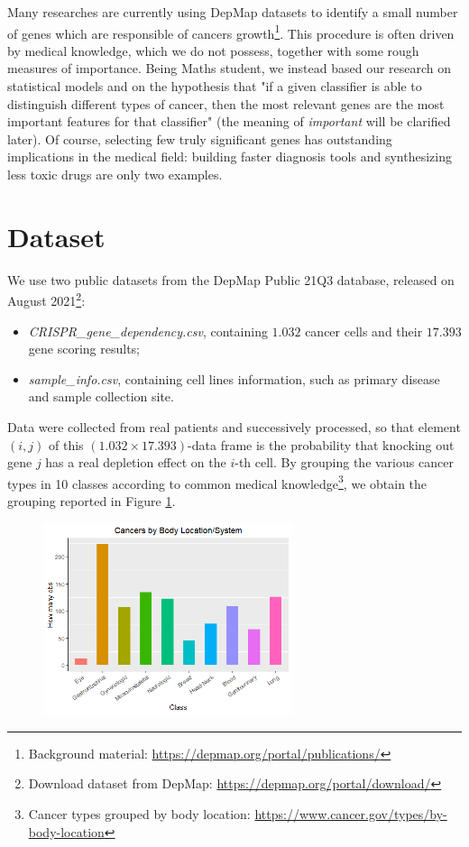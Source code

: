 \documentclass[a4paper,11pt, oneside]{article}  %
\begin{document}
Many researches are currently using DepMap datasets to identify a small number of genes which are responsible of cancers growth\footnote{Background material: \url{https://depmap.org/portal/publications/}}. This procedure is often driven by medical knowledge,  which we do not possess,  together with some rough measures of importance.  Being Maths student, we instead based our research on statistical models and on the hypothesis that "if a given classifier is able to distinguish different types of cancer,  then the most relevant genes are the most important features for that classifier" (the meaning of \textit{important} will be clarified later).  Of course,  selecting few truly significant genes has outstanding implications in the medical field: building faster diagnosis tools and synthesizing less toxic drugs are only two examples. 


\section{Dataset}
We use two public datasets from the DepMap Public 21Q3 database,  released on August 2021\footnote{Download dataset from DepMap:  \url{https://depmap.org/portal/download/}}:
\begin{itemize}
	\item \textit{CRISPR\_gene\_dependency.csv}, containing $1.032$ cancer cells and their $17.393$ gene scoring results;
	\item \textit{sample\_info.csv}, containing cell lines information,  such as primary disease and sample collection site.
\end{itemize}
Data were collected from real patients and successively processed,  so that element $(i, j)$ of this $(1.032 \times 17.393)$-data frame is the probability that knocking out gene $j$ has a real depletion effect on the $i$-th cell.
By grouping the various cancer types in 10 classes according to common medical knowledge\footnote{Cancer types grouped by body location: \url{https://www.cancer.gov/types/by-body-location}},  we obtain the grouping reported in Figure \ref{fig1}. 

\begin{figure}
	\includegraphics[width=0.65\textwidth]{plot1.png}
	\label{fig1}
\end{figure}
\end{document}
